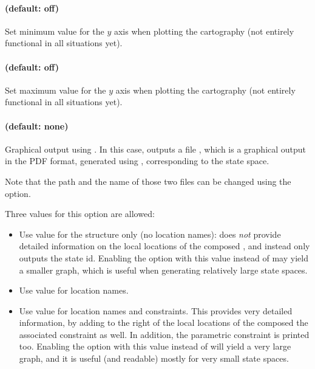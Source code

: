 \paragraph{ (default: off)}
Set minimum value for the $y$ axis when plotting the cartography (not entirely functional in all situations yet).

\paragraph{ (default: off)}
Set maximum value for the $y$ axis when plotting the cartography (not entirely functional in all situations yet).



\paragraph{ (default: none)}
Graphical output using \gdot{}.
In this case, \imitator{} outputs a file , which is a graphical output in the PDF format, generated using \gdot{}, corresponding to the state space.

Note that the path and the name of those two files can be changed using the  option.

Three values for this option are allowed:
\begin{itemize}
	\item Use value  for the structure only (no location names): does \emph{not} provide detailed information on the local locations of the composed \IPTA{}, and instead only outputs the state id.
	      Enabling the option with this value instead of  may yield a smaller graph, which is useful when generating relatively large state spaces.

	\item Use value  for location names.

	\item Use value  for location names and constraints.
	      This provides very detailed information, by adding to the right of the local locations of the composed \IPTA{} the associated constraint as well.
	      In addition, the parametric constraint is printed too.
	      Enabling the option with this value instead of  will yield a very large graph, and it is useful (and readable) mostly for very small state spaces.

\end{itemize}





